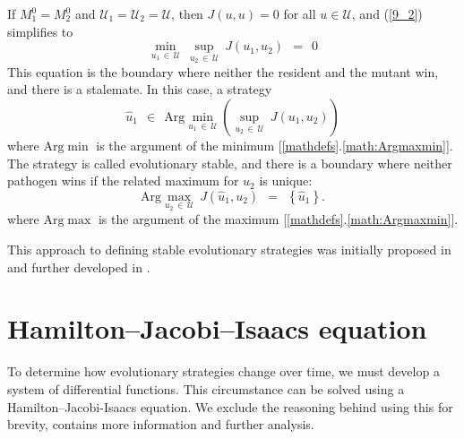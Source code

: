 \documentclass[11pt]{amsart}
\begin{document}
If $ M_1^0 = M_2^0 $ and $ \mathcal{U}_1 = \mathcal{U}_2 = \mathcal{U} ${\rm ,}
then $ J(u, u) = 0 $ for all $ u \in \mathcal{U} ${\rm ,} and {\rm (\ref{9_2})}
simplifies to
\begin{equation}
\min_{u_1 \, \in \, \mathcal{U}} \: \sup_{u_2 \, \in \, \mathcal{U}} \:
  J(u_1, u_2) \:\: = \:\: 0  \label{9_3}
\end{equation}
This equation is the boundary where neither the resident and the mutant win, and there is a stalemate.
In this case{\rm ,} a strategy
$$
\hat{u}_1 \:\: \in \:\: \mathrm{Arg} \min_{u_1 \, \in \, \mathcal{U}}
  \left( \sup_{u_2 \, \in \, \mathcal{U}} \: J(u_1, u_2) \right)
$$
where $\mathrm{Arg} \min$ is the argument of the minimum [\ref{mathdefs}.\ref{math:Argmaxmin}]. The strategy is called evolutionary stable, and there is a boundary where neither pathogen wins if the related maximum for $ u_2 $ is
unique:
$$
\mathrm{Arg} \max_{u_2 \, \in \, \mathcal{U}} \: J \left( \hat{u}_1, u_2
  \right) \:\: = \:\: \left\{ \hat{u}_1 \right\}.
$$
where $\mathrm{Arg}\max$ is the argument of the maximum [\ref{mathdefs}.\ref{math:Argmaxmin}].


This approach to defining stable evolutionary strategies was initially proposed
in \cite{BernhardGrognardMailleretAkhmetzhanov2010} and further developed
in \cite{YegorovGrognardMailleretHalkettBernhard2019}.


\section{Hamilton--Jacobi--Isaacs equation}
To determine how evolutionary strategies change over time, we must develop a system of differential functions. This circumstance can be solved using a Hamilton--Jacobi-Isaacs equation. We exclude the reasoning behind using this for brevity, \cite{YegorovGrognardMailleretHalkettBernhard2019} contains more information and further analysis.
\end{document}
